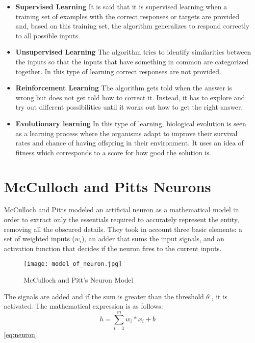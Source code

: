 \begin{itemize}
\item \textbf{Supervised Learning} It is said that it is supervised learning when a training set of examples with the correct responses or targets are provided and, based on this training set, the algorithm generalizes to respond correctly to all possible inputs.

\item \textbf{Unsupervised Learning} The algorithm tries to identify similarities between the inputs so that the inputs that have something in common are categorized together. In this type of learning correct responses are not provided.

\item \textbf{Reinforcement Learning} The algorithm gets told when the answer is wrong but does not get told how to correct it. Instead, it has to explore and try out different possibilities until it works out how to get the right answer. 

\item \textbf{Evolutionary learning} In this type of learning, biological evolution is seen as a learning process where the organisms adapt to improve their survival rates and chance of having offspring in their environment. It uses an idea of fitness which corresponds to a score for how good the solution is. 
\end{itemize}

\section{McCulloch and Pitts Neurons}
McCulloch and Pitts modeled an artificial neuron as a mathematical model in order to extract only the essentials required to accurately represent the entity, removing all the obscured details. They took in account three basic elements: a set of weighted inputs ($w_i$), an adder that sums the input signals, and an activation function that decides if the neuron fires to the current inputs.
\begin{figure}[h]
\centering
 
\texttt{[image: model\_of\_neuron.jpg]}
\caption{McCulloch and Pitt's Neuron Model}
\label{fig:neuron}
\end{figure}

The signals are added and if the sum is greater than the threshold $\theta$ , it is activated. The mathematical expression is as follows:\\
\begin{equation} \label{eq:neuron}
h=\sum_{i=1}^{m} w_i * x_i + b
\end{equation}\ref{eq:neuron}

